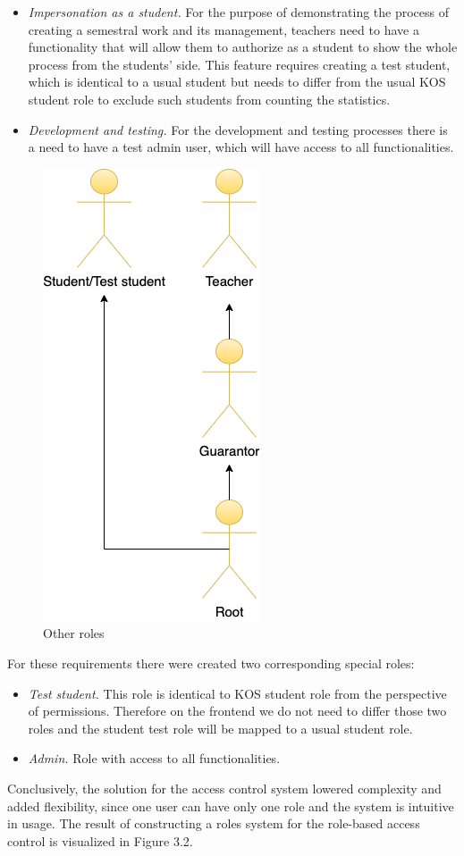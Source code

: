 \begin{itemize}
    \item \emph{Impersonation as a student.} For the purpose of demonstrating the process of creating a semestral work and its management, teachers need to have a functionality that will allow them to authorize as a student to show the whole process from the students' side. This feature requires creating a test student, which is identical to a usual student but needs  to differ from the usual KOS student role to exclude such students from counting the statistics. 
    \item \emph{Development and testing.} For the development and testing processes there is a need to have a test admin user, which will have access to all functionalities. 
\end{itemize}

\begin{figure}[h]
\centering
\includegraphics[scale=0.54]{../png/roles.png}
\caption{Other roles}\label{picture:special_roles}
\end{figure}


\noindent For these requirements there were created two corresponding special roles:

\begin{itemize}
    \item \emph{Test student.} This role is identical to KOS student role from the perspective of permissions. Therefore on the frontend we do not need to differ those two roles and the student test role will be mapped to a usual student role.
    \item \emph{Admin.} Role with access to all functionalities.
\end{itemize}

\noindent Conclusively, the solution for the access control system lowered complexity and added flexibility, since one user can have only one role and the system is intuitive in usage. The result of constructing a roles system for the role-based access control is visualized in Figure 3.2.
